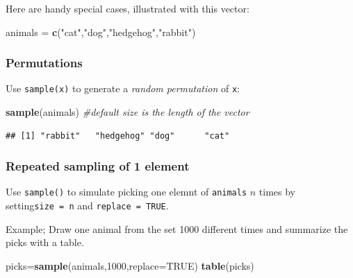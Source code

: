 \documentclass[
]{book}
\newenvironment{Shaded}{\begin{snugshade}}{\end{snugshade}}
\newcommand{\AttributeTok}[1]{\textcolor[rgb]{0.13,0.29,0.53}{#1}}
\newcommand{\CommentTok}[1]{\textcolor[rgb]{0.56,0.35,0.01}{\textit{#1}}}
\newcommand{\ConstantTok}[1]{\textcolor[rgb]{0.56,0.35,0.01}{#1}}
\newcommand{\DecValTok}[1]{\textcolor[rgb]{0.00,0.00,0.81}{#1}}
\newcommand{\FunctionTok}[1]{\textcolor[rgb]{0.13,0.29,0.53}{\textbf{#1}}}
\newcommand{\NormalTok}[1]{#1}
\newcommand{\OtherTok}[1]{\textcolor[rgb]{0.56,0.35,0.01}{#1}}
\newcommand{\StringTok}[1]{\textcolor[rgb]{0.31,0.60,0.02}{#1}}
\theoremstyle{definition}
\theoremstyle{definition}
\theoremstyle{definition}
\theoremstyle{definition}
\theoremstyle{remark}
\begin{document}
Here are handy special cases, illustrated with this vector:

\begin{Shaded}
\begin{Highlighting}[]
\NormalTok{animals }\OtherTok{=} \FunctionTok{c}\NormalTok{(}\StringTok{"cat"}\NormalTok{,}\StringTok{"dog"}\NormalTok{,}\StringTok{"hedgehog"}\NormalTok{,}\StringTok{"rabbit"}\NormalTok{)}
\end{Highlighting}
\end{Shaded}

\subsubsection*{Permutations}\label{permutations-1}

Use \texttt{sample(x)} to generate a \emph{random permutation} of \texttt{x}:

\begin{Shaded}
\begin{Highlighting}[]
\FunctionTok{sample}\NormalTok{(animals) }\CommentTok{\#default size is the length of the vector}
\end{Highlighting}
\end{Shaded}

\begin{verbatim}
## [1] "rabbit"   "hedgehog" "dog"      "cat"
\end{verbatim}

\subsubsection*{Repeated sampling of 1 element}\label{repeated-sampling-of-1-element}

Use \texttt{sample()} to simulate picking one elemnt of \texttt{animals} \(n\) times by setting\texttt{size\ =\ n} and \texttt{replace\ =\ TRUE}.

Example; Draw one animal from the set 1000 different times and summarize the picks with a table.

\begin{Shaded}
\begin{Highlighting}[]
\NormalTok{picks}\OtherTok{=}\FunctionTok{sample}\NormalTok{(animals,}\DecValTok{1000}\NormalTok{,}\AttributeTok{replace=}\ConstantTok{TRUE}\NormalTok{) }
\FunctionTok{table}\NormalTok{(picks) }
\end{Highlighting}
\end{Shaded}
\end{document}
